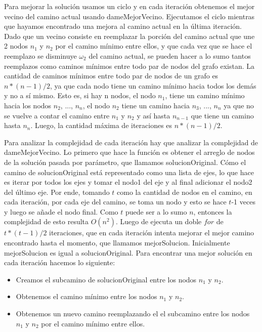 Para mejorar la solución usamos un ciclo y en cada iteración obtenemos el mejor vecino del camino actual usando dameMejorVecino. Ejecutamos el ciclo mientras que hayamos encontrado una mejora al camino actual en la última iteración. 
Dado que un vecino consiste en reemplazar la porción del camino actual que une 2 nodos $n_1$ y $n_2$ por el camino mínimo entre ellos, y que cada vez que se hace el reemplazo se disminuye $\omega_2$ del camino actual, se pueden hacer a lo sumo tantos reemplazos como caminos mínimos entre todo par de nodos del grafo existan. 
La cantidad de caminos mínimos entre todo par de nodos de un grafo es $n * (n-1) / 2$, ya que cada nodo tiene un camino mínimo hacia todos los demás y no a sí mismo. Esto es, si hay n nodos, el nodo $n_1$, tiene un camino mínimo hacia los nodos $n_2$, ..., $n_n$, el nodo $n_2$ tiene un camino hacia $n_3$, ..., $n_n$ ya que no se vuelve a contar el camino entre $n_1$ y $n_2$ y así hasta $n_{n-1}$ que tiene un camino hasta $n_n$.
Luego, la cantidad máxima de iteraciones es $n * (n-1) / 2$.

Para analizar la complejidad de cada iteración hay que analizar la complejidad de dameMejorVecino. 
Lo primero que hace la función es obtener el arreglo de nodos de la solución pasada por parámetro, que llamamos solucionOriginal. Cómo el camino de solucionOriginal está representado como una lista de ejes, lo que hace es iterar por todos los ejes y tomar el nodo1 del eje y al final adicionar el nodo2 del último eje. Por ende, tomando $t$ como la cantidad de nodos en el camino, en cada iteración, por cada eje del camino, se toma un nodo y esto se hace $t$-1 veces y luego se añade el nodo final. Como $t$ puede ser a lo sumo $n$, entonces la complejidad de esto resulta $O(n^2)$.
Luego de ejecuta un doble $for$ de $t * (t-1) / 2$ iteraciones, que en cada iteración intenta mejorar el mejor camino encontrado hasta el momento, que llamamos mejorSolucion. Inicialmente mejorSolucion es igual a solucionOriginal. 
Para encontrar una mejor solución en cada iteración hacemos lo siguiente:

\begin{itemize}
\item Creamos el subcamino de solucionOriginal entre los nodos $n_1$ y $n_2$.
\item Obtenemos el camino mínimo entre los nodos $n_1$ y $n_2$.
\item Obtenemos un nuevo camino reemplazando el el subcamino entre los nodos $n_1$ y $n_2$ por el camino mínimo entre ellos.
\end{itemize}

